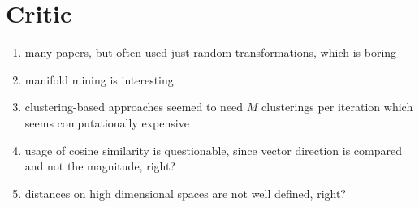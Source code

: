 \section{Critic}\label{sec:critic}

\begin{enumerate}
    \item many papers, but often used just random transformations, which is boring
    \item manifold mining is interesting
    \item clustering-based approaches seemed to need $M$ clusterings per iteration 
    which seems computationally expensive
    \item usage of cosine similarity is questionable, since vector direction is compared and 
    not the magnitude, right?
    \item distances on high dimensional spaces are not well defined, right?
\end{enumerate}

